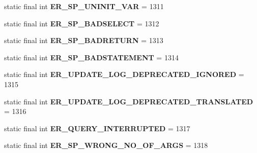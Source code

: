 \begin{DoxyCompactItemize}
static final int {\bfseries E\+R\+\_\+\+S\+P\+\_\+\+U\+N\+I\+N\+I\+T\+\_\+\+V\+AR} = 1311
\item 
\mbox{\label{classcom_1_1mysql_1_1jdbc_1_1_mysql_error_numbers_a3c3bb4aa729993a5e3ac1385c6a0e0d6}} 
static final int {\bfseries E\+R\+\_\+\+S\+P\+\_\+\+B\+A\+D\+S\+E\+L\+E\+CT} = 1312
\item 
\mbox{\label{classcom_1_1mysql_1_1jdbc_1_1_mysql_error_numbers_a54c5c8c735afcf8f1c47cbd876ae920f}} 
static final int {\bfseries E\+R\+\_\+\+S\+P\+\_\+\+B\+A\+D\+R\+E\+T\+U\+RN} = 1313
\item 
\mbox{\label{classcom_1_1mysql_1_1jdbc_1_1_mysql_error_numbers_a850dd6d83bc0df1f2212bd5c20e6d24f}} 
static final int {\bfseries E\+R\+\_\+\+S\+P\+\_\+\+B\+A\+D\+S\+T\+A\+T\+E\+M\+E\+NT} = 1314
\item 
\mbox{\label{classcom_1_1mysql_1_1jdbc_1_1_mysql_error_numbers_a43cc3a5c200e23a3ff6841c9f33c6171}} 
static final int {\bfseries E\+R\+\_\+\+U\+P\+D\+A\+T\+E\+\_\+\+L\+O\+G\+\_\+\+D\+E\+P\+R\+E\+C\+A\+T\+E\+D\+\_\+\+I\+G\+N\+O\+R\+ED} = 1315
\item 
\mbox{\label{classcom_1_1mysql_1_1jdbc_1_1_mysql_error_numbers_a985b34d043221bd750ec57b43386fe93}} 
static final int {\bfseries E\+R\+\_\+\+U\+P\+D\+A\+T\+E\+\_\+\+L\+O\+G\+\_\+\+D\+E\+P\+R\+E\+C\+A\+T\+E\+D\+\_\+\+T\+R\+A\+N\+S\+L\+A\+T\+ED} = 1316
\item 
\mbox{\label{classcom_1_1mysql_1_1jdbc_1_1_mysql_error_numbers_ad3b508b770d5857cabc9c0a492f55f18}} 
static final int {\bfseries E\+R\+\_\+\+Q\+U\+E\+R\+Y\+\_\+\+I\+N\+T\+E\+R\+R\+U\+P\+T\+ED} = 1317
\item 
\mbox{\label{classcom_1_1mysql_1_1jdbc_1_1_mysql_error_numbers_a5df4de57460f38fe586ec2c6ac3a75c1}} 
static final int {\bfseries E\+R\+\_\+\+S\+P\+\_\+\+W\+R\+O\+N\+G\+\_\+\+N\+O\+\_\+\+O\+F\+\_\+\+A\+R\+GS} = 1318
\item 

\end{DoxyCompactItemize}
